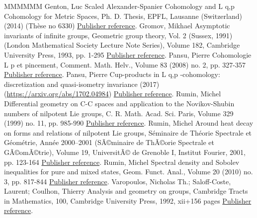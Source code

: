 \documentclass[11pt]{article}
\theoremstyle{definition}
\numberwithin{equation}{section}
\numberwithin{figure}{section}
\numberwithin{table}{section}
\begin{document}
\begin{thebibliography}{MMMMMM}
 Genton, Luc Scaled Alexander-Spanier Cohomology and L q,p  Cohomology for Metric Spaces, Ph. D. Thesis, EPFL, Lausanne (Switzerland) (2014) (Thèse no 6330) \href{https://ahl.centre-mersenne.org/item/AHL_2018__1__267_0/#Genton}{Publisher reference}.
 Gromov, Mikhael Asymptotic invariants of infinite groups, Geometric group theory, Vol. 2 (Sussex, 1991) (London Mathematical Society Lecture Note Series), Volume 182, Cambridge University Press, 1993, pp. 1-295 \href{https://ahl.centre-mersenne.org/item/AHL_2018__1__267_0/#Gromov}{Publisher reference}.
 Pansu, Pierre Cohomologie L p  et pincement, Comment. Math. Helv., Volume 83 (2008) no. 2, pp. 327-357 \href{https://ahl.centre-mersenne.org/item/AHL_2018__1__267_0/#Pansu4}{Publisher reference}.
 Pansu, Pierre Cup-products in L q,p -cohomology: discretization and quasi-isometry invariance (2017) (\url{https://arxiv.org/abs/1702.04984}) \href{https://ahl.centre-mersenne.org/item/AHL_2018__1__267_0/#Pansu2}{Publisher reference}.
 Rumin, Michel Differential geometry on C-C spaces and application to the Novikov-Shubin numbers of nilpotent Lie groups, C. R. Math. Acad. Sci. Paris, Volume 329 (1999) no. 11, pp. 985-990 \href{https://ahl.centre-mersenne.org/item/AHL_2018__1__267_0/#Rumin_CRAS_1999}{Publisher reference}.
 Rumin, Michel Around heat decay on forms and relations of nilpotent Lie groups, Séminaire de Théorie Spectrale et Géométrie, Année 2000–2001 (SÃ©minaire de ThÃ©orie Spectrale et GÃ©omÃ©trie), Volume 19, UniversitÃ© de Grenoble I, Institut Fourier, 2001, pp. 123-164 \href{https://ahl.centre-mersenne.org/item/AHL_2018__1__267_0/#Rumin_TSG}{Publisher reference}.
 Rumin, Michel Spectral density and Sobolev inequalities for pure and mixed states, Geom. Funct. Anal., Volume 20 (2010) no. 3, pp. 817-844 \href{https://ahl.centre-mersenne.org/item/AHL_2018__1__267_0/#Rumin10}{Publisher reference}.
 Varopoulos, Nicholas Th.; Saloff-Coste, Laurent; Coulhon, Thierry Analysis and geometry on groups, Cambridge Tracts in Mathematics, 100, Cambridge University Press, 1992, xii+156 pages \href{https://ahl.centre-mersenne.org/item/AHL_2018__1__267_0/#VCSC}{Publisher reference}.
\end{thebibliography}
\end{document}
